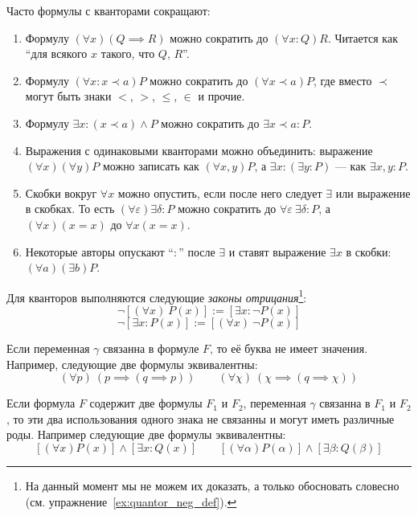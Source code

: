 Часто формулы с кванторами сокращают:
\begin{enumerate}
	\item{}Формулу ${(\forall x)(Q\implies R)}$ можно сократить
	до ${(\forall x:Q)R}$. Читается как ``для всякого $x$ такого, что
	$Q$, $R$''.

	\item{}Формулу $(\forall x:x\prec a)P$ можно сократить до $(\forall x\prec a)P$,
	где вместо $\prec$ могут быть знаки $<$, $>$, $\leq$, $\in$ и прочие.

	\item{}Формулу $\exists x:(x\prec a)\land P$ можно сократить
	до $\exists x\prec a:P$.

	\item{}Выражения с одинаковыми кванторами можно объединить:
	выражение $(\forall x)(\forall y)P$ можно записать как $(\forall x,y)P$,
	а ${\exists x:(\exists y:P)}$ --- как $\exists x,y:P$.

	\item{}Скобки вокруг $\forall x$ можно опустить, если после него следует $\exists$ или
	выражение в скобках.
	То есть ${(\forall \varepsilon)\exists \delta:P}$
	можно сократить до $\forall \varepsilon~\exists \delta:P$,
	а $(\forall x)(x=x)$ до $\forall x(x=x)$.

	\item{}Некоторые авторы опускают ``$:$'' после $\exists$ и
	ставят выражение $\exists x$ в скобки: $(\forall a)(\exists b)P$.
\end{enumerate}

Для кванторов выполняются следующие {\it законы отрицания}\footnote{
	На данный момент мы не можем их доказать, а только
	обосновать словесно (см. упражнение~\ref{ex:quantor_neg_def}).
}:
\[
	\lnot[(\forall x)~P(x)]:=[\exists x:\lnot P(x)]
\]
\[
	\lnot[\exists x:P(x)]:=[(\forall x)~\lnot P(x)]
\]

Если переменная $\gamma$ связанна в формуле $F$, то её буква не имеет значения.
Например, следующие две формулы эквивалентны:
\[
	(\forall p)~(p\implies (q\implies p))\qquad
	(\forall \chi)~(\chi\implies (q\implies\chi))
\]

Если формула $F$ содержит две формулы $F_1$ и $F_2$, переменная
$\gamma$ связанна в $F_1$ и $F_2$, то эти два использования
одного знака не связанны и могут иметь различные роды.
Например следующие две формулы эквивалентны:
\[
	[(\forall x)P(x)]\land[\exists x:Q(x)]\qquad
	[(\forall \alpha)P(\alpha)]\land[\exists \beta:Q(\beta)]
\]

